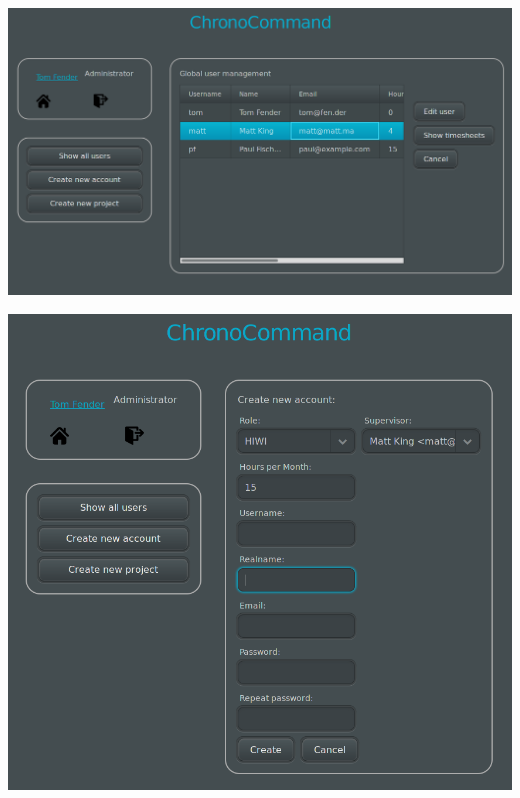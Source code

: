 \begin{frame}
	\begin{center}
		\includegraphics[width=\linewidth,height=0.9\textheight,keepaspectratio]{images/admin-overview.png}
	\end{center}
\end{frame}

\begin{frame}
	\begin{center}
		\includegraphics[width=\linewidth,height=0.9\textheight,keepaspectratio]{images/create-user.png}
	\end{center}
\end{frame}

